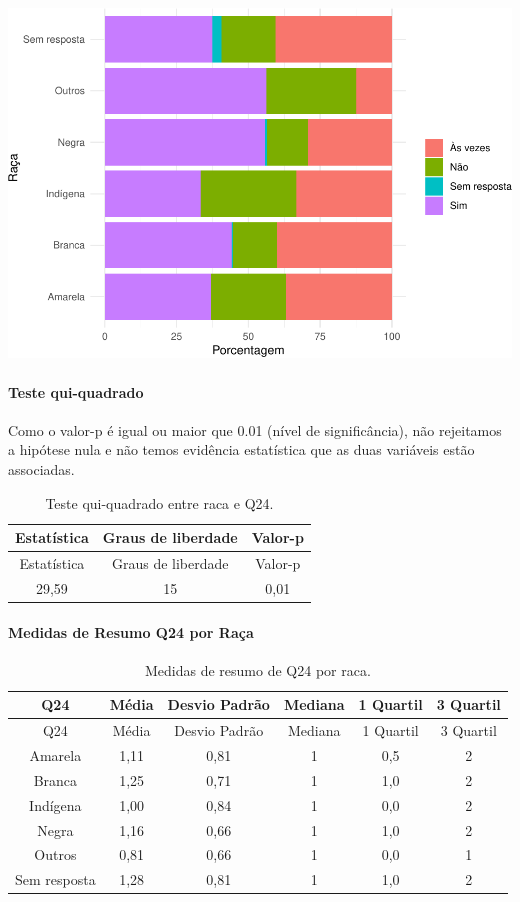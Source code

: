 \documentclass[]{article}
\let\oldparagraph\paragraph
\renewcommand{\paragraph}[1]{\oldparagraph{#1}\mbox{}}
\begin{document}
\begin{center}\includegraphics[width=0.75\linewidth]{relatorio_covid19_files/figure-latex/unnamed-chunk-634-1} \end{center}

\hypertarget{teste-qui-quadrado-55}{%
\paragraph{Teste qui-quadrado}\label{teste-qui-quadrado-55}}

Como o valor-p é igual ou maior que 0.01 (nível de significância), não rejeitamos a hipótese nula e não temos evidência estatística que as duas variáveis estão associadas.

\begin{longtable}[]{@{}ccc@{}}
\caption{\label{tab:unnamed-chunk-636}Teste qui-quadrado entre raca e Q24.}\tabularnewline
\toprule
Estatística & Graus de liberdade & Valor-p\tabularnewline
\midrule
\endfirsthead
\toprule
Estatística & Graus de liberdade & Valor-p\tabularnewline
\midrule
\endhead
29,59 & 15 & 0,01\tabularnewline
\bottomrule
\end{longtable}

\cleardoublepage

\hypertarget{medidas-de-resumo-q24-por-rauxe7a}{%
\paragraph{Medidas de Resumo Q24 por Raça}\label{medidas-de-resumo-q24-por-rauxe7a}}

\begin{longtable}[]{@{}cccccc@{}}
\caption{\label{tab:unnamed-chunk-637}Medidas de resumo de Q24 por raca.}\tabularnewline
\toprule
Q24 & Média & Desvio Padrão & Mediana & 1 Quartil & 3 Quartil\tabularnewline
\midrule
\endfirsthead
\toprule
Q24 & Média & Desvio Padrão & Mediana & 1 Quartil & 3 Quartil\tabularnewline
\midrule
\endhead
Amarela & 1,11 & 0,81 & 1 & 0,5 & 2\tabularnewline
Branca & 1,25 & 0,71 & 1 & 1,0 & 2\tabularnewline
Indígena & 1,00 & 0,84 & 1 & 0,0 & 2\tabularnewline
Negra & 1,16 & 0,66 & 1 & 1,0 & 2\tabularnewline
Outros & 0,81 & 0,66 & 1 & 0,0 & 1\tabularnewline
Sem resposta & 1,28 & 0,81 & 1 & 1,0 & 2\tabularnewline
\bottomrule
\end{longtable}
\end{document}
